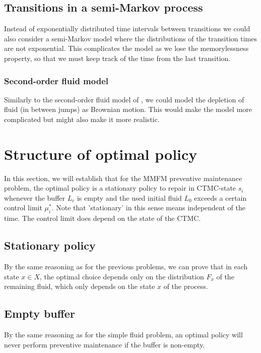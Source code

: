 \documentclass[a4paper]{thesis}
\theoremstyle{definition}
\begin{document}
\subsection{Transitions in a semi-Markov process}
Instead of exponentially distributed time intervals between transitions we could also consider a semi-Markov model where the distributions of the transition times are not exponential.
This complicates the model as we lose the memorylessness property, so that we must keep track of the time from the last transition.

\subsubsection{Second-order fluid model}
Similarly to the second-order fluid model of \cite{Gribaudo2007}, we could model the depletion of fluid (in between jumps) as Brownian motion.
This would make the model more complicated but might also make it more realistic. \section{Structure of optimal policy}
In this section, we will establish that for the MMFM preventive maintenance problem, the optimal policy is a stationary policy to repair in CTMC-state $s_i$ whenever the buffer $L_c$ is empty and the used initial fluid $L_0$ exceeds a certain control limit $\mu_i^*$.
Note that 'stationary' in this sense means independent of the time. 
The control limit does depend on the state of the CTMC.

\subsection{Stationary policy}
By the same reasoning as for the previous problems, we can prove that in each state $x\in X$, the optimal choice depends only on the distribution $F_x$ of the remaining fluid, which only depends on the state $x$ of the process.

\subsection{Empty buffer}
By the same reasoning as for the simple fluid problem, an optimal policy will never perform preventive maintenance if the buffer is non-empty.
\end{document}
